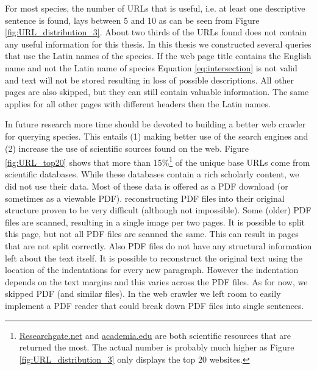 \documentclass[a4paper, 12pt, oneside]{book} %
\begin{document}
For most species, the number of URLs that is useful, i.e. at least one descriptive sentence is found, lays between 5 and 10 as can be seen from Figure \ref{fig:URL_distribution_3}.
About two thirds of the URLs found does not contain any useful information for this thesis.
In this thesis we constructed several queries that use the Latin names of the species.
If the web page title contains the English name and not the Latin name of species Equation \ref{eq:intersection} is not valid and text will not be stored resulting in loss of possible descriptions.
All other pages are also skipped, but they can still contain valuable information.
The same applies for all other pages with different headers then the Latin names.

In future research more time should be devoted to building a better web crawler for querying species.
This entails (1) making better use of the search engines and (2) increase the use of scientific sources found on the web.
Figure \ref{fig:URL_top20} shows that more than 15\%\footnote{\href{https://www.researchgate.net/}{Researchgate.net} and \href{https://www.academia.edu/}{academia.edu} are both scientific resources that are returned the most. The actual number is probably much higher as Figure \ref{fig:URL_distribution_3} only displays the top 20 websites.} of the unique base URLs come from scientific databases.
While these databases contain a rich scholarly content, we did not use their data.
Most of these data is offered as a PDF download (or sometimes as a viewable PDF).
reconstructing PDF files into their original structure proven to be very difficult (although not impossible).
Some (older) PDF files are scanned, resulting in a single image per two pages. 
It is possible to split this page, but not all PDF files are scanned the same. 
This can result in pages that are not split correctly.
Also PDF files do not have any structural information left about the text itself. 
It is possible to reconstruct the original text using the location of the indentations for every new paragraph.
However the indentation depends on the text margins and this varies across the PDF files.
As for now, we skipped PDF (and similar files). 
In the web crawler we left room to easily implement a PDF reader that could break down PDF files into single sentences.
\end{document}
